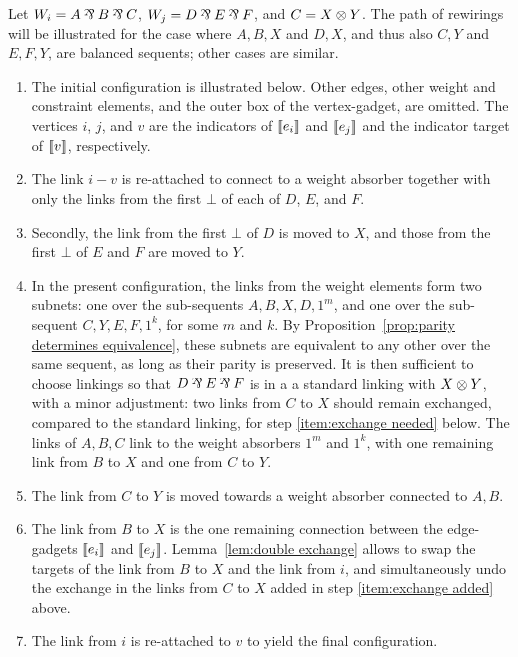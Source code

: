\documentclass[conference]{IEEEtran}
\begin{document}
\begin{IEEEproof}
Let $W_i=A\parr B\parr C$, $W_j=D\parr E\parr F$, and $C=X\otimes Y$.
%
The path of rewirings will be illustrated for the case where $A,B,X$ and $D,X$, and thus also $C,Y$ and $E,F,Y$, are balanced sequents; other cases are similar.
%
\begin{enumerate}
	\item
The initial configuration is illustrated below. 
%
Other edges, other weight and constraint elements, and the outer box of the vertex-gadget, are omitted.
%
The vertices $i$, $j$, and  $v$ are the indicators of $\llbracket e_i\rrbracket$ and $\llbracket e_j\rrbracket$ and the indicator target of $\llbracket v\rrbracket$, respectively.
%


	\item
The link $i-v$ is re-attached to connect to a weight absorber together with only the links from the first $\bot$ of each of $D$, $E$, and $F$. 
%


	\item
Secondly, the link from the first $\bot$ of $D$ is moved to $X$, and those from the first $\bot$ of $E$ and $F$ are moved to $Y$.
%


	\item\label{item:exchange added}
In the present configuration, the links from the weight elements form two subnets: one over the sub-sequents $A,B,X,D,1^m$, and one over the sub-sequent $C,Y,E,F,1^k$, for some $m$ and $k$.
%
By Proposition~\ref{prop:parity determines equivalence}, these subnets are equivalent to any other over the same sequent, as long as their parity is preserved.
%
It is then sufficient to choose linkings so that $D\parr E\parr F$ is in a a standard linking with $X\otimes Y$, with a minor adjustment: two links from $C$ to $X$ should remain exchanged, compared to the standard linking, for step \ref{item:exchange needed} below.
%
The links of $A,B,C$ link to the weight absorbers $1^m$ and $1^k$, with one remaining link from $B$ to $X$ and one from $C$ to $Y$.
%
\displayOcto{\octorollC}


	\item
The link from $C$ to $Y$ is moved towards a weight absorber connected to $A,B$.
%


	\item\label{item:exchange needed}
The link from $B$ to $X$ is the one remaining connection between the edge-gadgets $\llbracket e_i\rrbracket$ and $\llbracket e_j\rrbracket$.
%
Lemma~\ref{lem:double exchange} allows to swap the targets of the link from $B$ to $X$ and the link from $i$, and simultaneously undo the exchange in the links from $C$ to $X$ added in step \ref{item:exchange added} above.
%


	\item
The link from $i$ is re-attached to $v$ to yield the final configuration.
%
\end{enumerate}
\end{IEEEproof}
\end{document}
